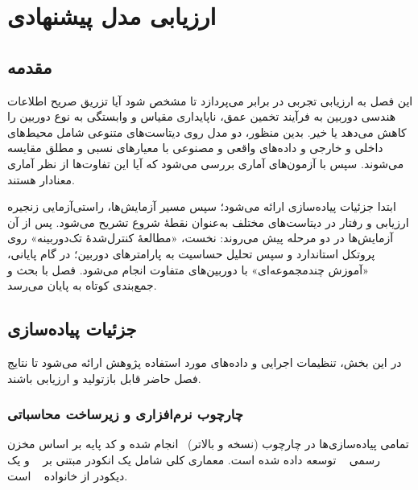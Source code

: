 \chapter{ارزیابی مدل پیشنهادی}
\thispagestyle{fancy}\clearpage
\label{chap:results}

\section{مقدمه}
این فصل به ارزیابی تجربی \proposedmodel{} در برابر \basemodel{}
می‌پردازد تا مشخص شود آیا تزریق صریح اطلاعات هندسی دوربین
به فرآیند تخمین عمق، ناپایداری مقیاس و وابستگی به نوع دوربین را کاهش می‌دهد یا خیر.
بدین منظور، دو مدل روی دیتاست‌های متنوعی شامل محیط‌های داخلی و خارجی و داده‌های واقعی و مصنوعی
با معیارهای نسبی و مطلق مقایسه می‌شوند.
سپس با آزمون‌های آماری بررسی می‌شود که آیا این تفاوت‌ها از نظر آماری معنادار هستند.

ابتدا جزئیات پیاده‌سازی ارائه می‌شود؛ سپس مسیر آزمایش‌ها، راستی‌آزمایی زنجیره ارزیابی و رفتار \basemodel{} در دیتاست‌های مختلف به‌عنوان نقطهٔ شروع تشریح می‌شود. پس از آن آزمایش‌ها در دو مرحله پیش می‌روند: نخست، «مطالعهٔ کنترل‌شدهٔ تک‌دوربینه» روی پروتکل استاندارد  و سپس تحلیل حساسیت به پارامترهای دوربین؛ در گام پایانی، «آموزش چندمجموعه‌ای» با دوربین‌های متفاوت انجام می‌شود. فصل با بحث و جمع‌بندی کوتاه به پایان می‌رسد.

\section{جزئیات پیاده‌سازی}
\label{sec:implementation_details_ch4}

در این بخش، تنظیمات اجرایی و داده‌های مورد استفاده پژوهش ارائه می‌شود تا نتایج فصل حاضر قابل بازتولید و ارزیابی باشند.

\subsection{چارچوب نرم‌افزاری و زیرساخت محاسباتی}

تمامی پیاده‌سازی‌ها در چارچوب  (نسخه  و بالاتر)~\cite{Paszke2019PyTorch} انجام شده و کد پایه بر اساس مخزن رسمی ~\cite{DepthAnythingV2} توسعه داده شده است. معماری کلی شامل یک انکودر مبتنی بر ~\cite{Oquab2023DINOv2,Dosovitskiy2020ViT} و یک دیکودر از خانواده ~\cite{Ranftl2021DPT} است.

